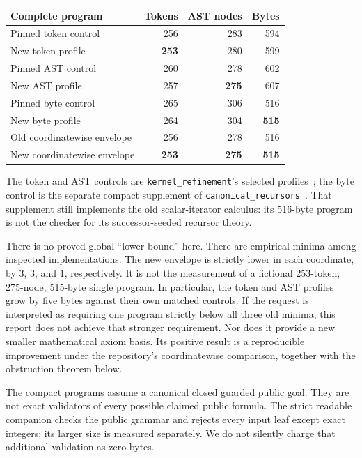 \documentclass[11pt]{article}
\theoremstyle{definition}
\theoremstyle{remark}
\begin{document}
\begin{center}
\begin{tabular}{lrrr}
\toprule
Complete program & Tokens & AST nodes & Bytes\\
\midrule
Pinned token control & 256 & 283 & 594\\
New token profile & \textbf{253} & 280 & 599\\
Pinned AST control & 260 & 278 & 602\\
New AST profile & 257 & \textbf{275} & 607\\
Pinned byte control & 265 & 306 & 516\\
New byte profile & 264 & 304 & \textbf{515}\\
\midrule
Old coordinatewise envelope & 256 & 278 & 516\\
New coordinatewise envelope & \textbf{253} & \textbf{275} & \textbf{515}\\
\bottomrule
\end{tabular}
\end{center}

The token and AST controls are \texttt{kernel\_refinement}'s selected
profiles~\cite{kernel}; the byte control is the separate compact supplement
of \texttt{canonical\_recursors}~\cite{canonical}.  That supplement still
implements the old scalar-iterator calculus: its 516-byte program is not
the checker for its successor-seeded recursor theory.

There is no proved global ``lower bound'' here.  There are empirical minima
among inspected implementations.  The new envelope is strictly lower in
each coordinate, by $3$, $3$, and $1$, respectively.  It is not the
measurement of a fictional 253-token, 275-node, 515-byte single program.
In particular, the token and AST profiles grow by five bytes against their
own matched controls.  If the request is interpreted as requiring one
program strictly below all three old minima, this report does not achieve
that stronger requirement.  Nor does it provide a new smaller mathematical
axiom basis.  Its positive result is a reproducible improvement under the
repository's coordinatewise comparison, together with the obstruction
theorem below.

The compact programs assume a canonical closed guarded public goal.
They are not exact validators of every possible claimed public formula.
The strict readable companion checks the public grammar and rejects every
input leaf except exact integers; its larger size is measured separately.
We do not silently charge that additional validation as zero bytes.
\end{document}
